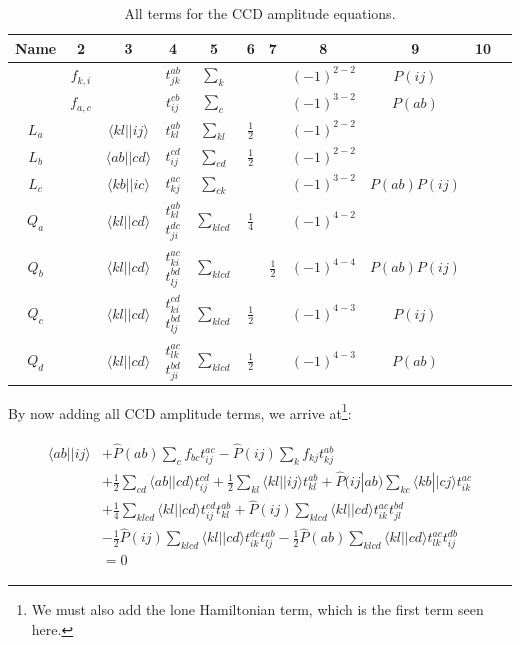 \documentclass[10pt]{report}
\begin{document}
	\begin{table}[h]
	\centering
	\begin{tabular}{ccccccccccc}
		Name & 2 & 3 & 4 & 5 & 6 & 7 & 8 & 9 & 10 & \\ \hline
		& $f_{k,i}$ &  & $t_{jk}^{ab}$ & $\sum_{k}$ &  &  & $(-1)^{2-2}$ & $P(ij)$ & &\\
		& $f_{a,c}$ &  & $t_{ij}^{cb}$ & $\sum_{c}$ &  &  & $(-1)^{3-2}$ & $P(ab)$ & &\\
		$L_a$ & & $\langle kl||ij \rangle$ & $t_{kl}^{ab}$ & $\sum_{kl}$ & $\frac{1}{2}$ &  & $(-1)^{2-2}$ &  & &\\
		$L_b$ & & $\langle ab||cd \rangle$ & $t_{ij}^{cd}$ & $\sum_{cd}$ & $\frac{1}{2}$ &  & $(-1)^{2-2}$ &  & &\\
		$L_c$ & & $\langle kb||ic \rangle$ & $t_{kj}^{ac}$ & $\sum_{ck}$ &  &  & $(-1)^{3-2}$ & $P(ab)P(ij)$ & &\\
		$Q_a$ & & $\langle kl||cd \rangle$ & $t_{kl}^{ab}$ $t_{ji}^{dc}$ & $\sum_{klcd}$ & $\frac{1}{4}$ &  & $(-1)^{4-2}$ &  & &\\
		$Q_b$ & & $\langle kl||cd \rangle$ & $t_{ki}^{ac}$ $t_{lj}^{bd}$ & $\sum_{klcd}$ &  & $\frac{1}{2}$ & $(-1)^{4-4}$ & $P(ab)P(ij)$ & &\\
		$Q_c$ & & $\langle kl||cd \rangle$ & $t_{ki}^{cd}$ $t_{lj}^{bd}$ & $\sum_{klcd}$ & $\frac{1}{2}$ &  & $(-1)^{4-3}$ & $P(ij)$ & &\\
		$Q_d$ & & $\langle kl||cd \rangle$ & $t_{lk}^{ac}$ $t_{ji}^{bd}$ & $\sum_{klcd}$ & $\frac{1}{2}$ &  & $(-1)^{4-3}$ & $P(ab)$ & & \\ \hline
	\end{tabular}
	\caption{All terms for the CCD amplitude equations.}
	\label{CC | table | "CCD amp eq derivation"}
	\end{table}
	
	By now adding all CCD amplitude terms, we arrive at\footnote{We must also add the lone Hamiltonian term, which is the first term seen here.}:
	
	\begin{align}
		\begin{split}
		\langle ab||ij\rangle &+ \hat{P}(ab)\sum_{c}f_{bc}t_{ij}^{ac} - \hat{P}(ij)\sum_{k}f_{kj}t_{kj}^{ab}\\
		&+ \frac{1}{2}\sum_{cd}\langle ab||cd\rangle t_{ij}^{cd} + \frac{1}{2}\sum_{kl}\langle kl||ij\rangle t_{kl}^{ab} + \hat{P}(ij|ab)\sum_{kc}\langle kb||cj\rangle t_{ik}^{ac}\\
		&+ \frac{1}{4}\sum_{klcd}\langle kl||cd\rangle t_{ij}^{cd}t_{kl}^{ab} + \hat{P}(ij)\sum_{klcd}\langle kl||cd\rangle t_{ik}^{ac}t_{jl}^{bd}\\
		&- \frac{1}{2}\hat{P}(ij)\sum_{klcd}\langle kl||cd\rangle t_{ik}^{dc}t_{lj}^{ab} - \frac{1}{2}\hat{P}(ab)\sum_{klcd}\langle kl||cd\rangle t_{lk}^{ac}t_{ij}^{db}\\
		&= 0
		\end{split}
	\end{align}
	
\end{document}
